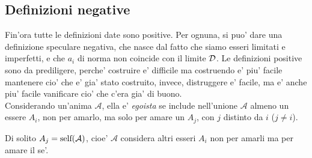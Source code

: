 %
%
\subsection{Definizioni negative}

Fin'ora tutte le definizioni date sono positive. Per ognuna, si puo' dare una definizione speculare negativa, che nasce dal fatto che siamo esseri limitati e imperfetti, e che $a_i$ di norma non coincide con il limite $\mathcal{D}$. Le definizioni positive sono da prediligere, perche' costruire e' difficile ma costruendo e' piu' facile mantenere cio' che e' gia' stato costruito, invece, distruggere e' facile, ma e' anche piu' facile vanificare cio' che c'era gia' di buono.\\

Considerando un'anima $\mathcal{A}$, ella e' \emph{egoista} se include nell'unione $\mathcal{A}$ almeno un essere $A_i$, non per amarlo, ma solo per amare un $A_j$, con $j$ distinto da $i$ ($j\ne i$).

Di solito $A_j = \textrm{self}(\mathcal{A})$, cioe' $\mathcal{A}$ considera altri esseri $A_i$ non per amarli ma per amare il se'.\\

